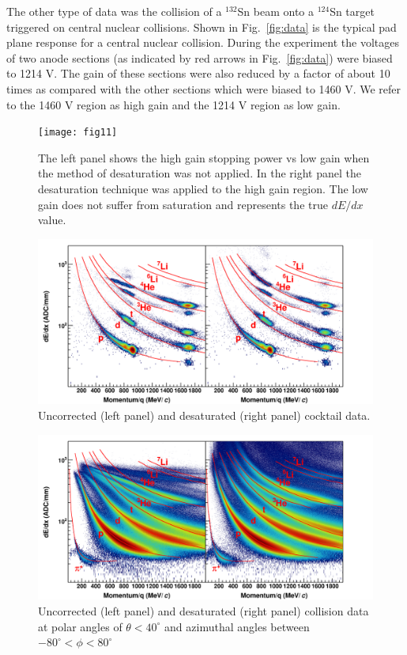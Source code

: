 \documentclass[review,number,sort&compress]{elsarticle}
\begin{document}
The other type of data was the collision of a ${}^{132}$Sn beam onto a ${}^{124}$Sn target triggered on central nuclear collisions. Shown in Fig.~\ref{fig:data} is the typical pad plane response for a central nuclear collision. During the experiment the voltages of two anode sections (as indicated by red arrows in Fig.~\ref{fig:data}) were biased to 1214 V. The gain of these sections were also reduced by a factor of about 10 times as compared with the other sections which were biased to 1460 V. We refer to the 1460 V region as high gain and the 1214 V region as low gain. 

\begin{figure}[t]
\centering
\texttt{[image: fig11]}
\caption{The left panel shows the high gain stopping power vs low gain when the method of desaturation was not applied. In the right panel the desaturation technique was applied to the high gain region. The low gain does not suffer from saturation and represents the true $dE/dx$ value.}
\label{fig:lowvshigh}
\end{figure}

\begin{figure}[t]
\includegraphics[width=\linewidth]{fig12}
\caption{Uncorrected (left panel) and desaturated (right panel) cocktail data.}
\label{fig:cocktail_combine}
\end{figure}

\begin{figure}[t]
\includegraphics[width=\linewidth]{fig13}
\caption{Uncorrected (left panel) and desaturated (right panel) collision data at polar angles of $\theta < 40^{\circ}$ and azimuthal angles between $-80^{\circ} < \phi < 80^{\circ}$}
\label{fig:data_combine}
\end{figure}
\end{document}
